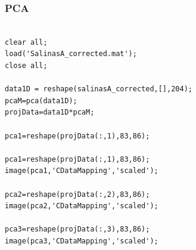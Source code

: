 \documentclass{article}
\begin{document}
\subsubsection{PCA}
\begin{lstlisting}

clear all;
load('SalinasA_corrected.mat');
close all;

data1D = reshape(salinasA_corrected,[],204);
pcaM=pca(data1D);
projData=data1D*pcaM;

pca1=reshape(projData(:,1),83,86);

pca1=reshape(projData(:,1),83,86);
image(pca1,'CDataMapping','scaled');

pca2=reshape(projData(:,2),83,86);
image(pca2,'CDataMapping','scaled');

pca3=reshape(projData(:,3),83,86);
image(pca3,'CDataMapping','scaled');
\end{lstlisting}
\end{document}
